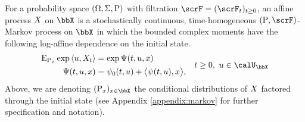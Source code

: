 \begin{definition}
  \label{definition:affine-process}
  For a probability space $(\Omega, \Sigma, {\operatorname{P}})$ with filtration $\scrF = (\scrF_t)_{t\geq0}$, an affine process $X$ on $\stateSpace$ is a stochastically continuous, time-homogeneous $(\Prb, \scrF)$-Markov process on $\stateSpace$ in which the bounded complex moments have the following log-affine dependence on the initial state.
  \begin{align}
    \label{eq:affine-definition}
    &\begin{aligned}
      \Exp_{\Prb_\stateVar}\exp\prj{\momentVar}{\X_t} &= \exp\aff(t, \momentVar, \stateVar) \\
      \aff(t, \momentVar, \stateVar) &= \affPart_0(t, \momentVar) + \bprj{\affPart(t, \momentVar)}{\stateVar},  \\
    \end{aligned}
    & t \geq 0, ~ \momentVar \in \boundedSpace
  \end{align}
  Above, we are denoting $(\Prb_\stateVar)_{\stateVar\in\stateSpace}$ the conditional distributions of $X$ factored through the initial state (see Appendix \ref{appendix:markov} for further specification and notation).
\end{definition}
